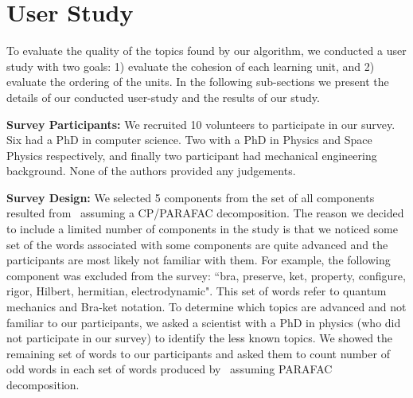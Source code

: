 

\section{User Study}
To evaluate the quality of the topics found by our algorithm, we conducted a user study with two goals: 1) evaluate the cohesion of each learning unit, and 2) evaluate the ordering of the units. In the following sub-sections we present the details of our conducted user-study and the results of our study.

\textbf{Survey Participants:}
We recruited 10 volunteers to participate in our survey. Six had a PhD in computer science. Two with a PhD in Physics and Space Physics respectively, and finally two participant had mechanical engineering background.
None of the authors provided any judgements.

\textbf{Survey Design:}
We selected 5 components from the set of all components resulted from \ourAlgo\ assuming a CP/PARAFAC decomposition.  The reason we decided to  include a limited number of components in the study is that we noticed  some set of the words associated with some components are quite  advanced and the participants are most likely not familiar with them. For example, the following component was excluded from the survey: ``bra, preserve, ket, property, configure, rigor, Hilbert, hermitian, electrodynamic". This set of words refer to  quantum mechanics and Bra-ket notation. To determine which topics are advanced and not familiar to our participants, we asked a scientist with a PhD in physics (who did not participate in our survey) to identify the less known topics.  
 We showed the remaining set of  words  to our participants and asked them to count number of odd words in each set of words produced by \ourAlgo\ assuming PARAFAC decomposition.

